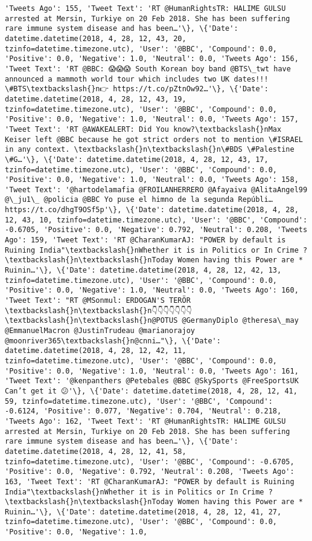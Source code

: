 \documentclass[11pt]{article}
\begin{document}
\begin{Verbatim}[commandchars=\\\{\}]
'Tweets Ago': 155, 'Tweet Text': 'RT @HumanRightsTR: HALIME GULSU arrested at Mersin, Turkiye on 20 Feb 2018. She has been suffering rare immune system disease and has been…'\}, \{'Date': datetime.datetime(2018, 4, 28, 12, 43, 20, tzinfo=datetime.timezone.utc), 'User': '@BBC', 'Compound': 0.0, 'Positive': 0.0, 'Negative': 1.0, 'Neutral': 0.0, 'Tweets Ago': 156, 'Tweet Text': 'RT @BBC: 😱😱😱 South Korean boy band @BTS\_twt have announced a mammoth world tour which includes two UK dates!!! \#BTS\textbackslash{}n👉 https://t.co/pZtnOw92…'\}, \{'Date': datetime.datetime(2018, 4, 28, 12, 43, 19, tzinfo=datetime.timezone.utc), 'User': '@BBC', 'Compound': 0.0, 'Positive': 0.0, 'Negative': 1.0, 'Neutral': 0.0, 'Tweets Ago': 157, 'Tweet Text': 'RT @AWAKEALERT: Did You know?\textbackslash{}nMax Keiser left @BBC because he got strict orders not to mention \#ISRAEL in any context. \textbackslash{}n\textbackslash{}n\#BDS \#Palestine \#G…'\}, \{'Date': datetime.datetime(2018, 4, 28, 12, 43, 17, tzinfo=datetime.timezone.utc), 'User': '@BBC', 'Compound': 0.0, 'Positive': 0.0, 'Negative': 1.0, 'Neutral': 0.0, 'Tweets Ago': 158, 'Tweet Text': '@hartodelamafia @FROILANHERRERO @Afayaiva @AlitaAngel99 @\_ju1\_ @policia @BBC Yo puse el himno de la segunda Repúbli… https://t.co/dhgT9OSf5p'\}, \{'Date': datetime.datetime(2018, 4, 28, 12, 43, 10, tzinfo=datetime.timezone.utc), 'User': '@BBC', 'Compound': -0.6705, 'Positive': 0.0, 'Negative': 0.792, 'Neutral': 0.208, 'Tweets Ago': 159, 'Tweet Text': 'RT @CharanKumarAJ: "POWER by default is Ruining India"\textbackslash{}nWhether it is in Politics or In Crime ? \textbackslash{}n\textbackslash{}nToday Women having this Power are * Ruinin…'\}, \{'Date': datetime.datetime(2018, 4, 28, 12, 42, 13, tzinfo=datetime.timezone.utc), 'User': '@BBC', 'Compound': 0.0, 'Positive': 0.0, 'Negative': 1.0, 'Neutral': 0.0, 'Tweets Ago': 160, 'Tweet Text': "RT @MSonmul: ERDOGAN'S TERÖR \textbackslash{}n\textbackslash{}n👇👇👇👇👇👇👇\textbackslash{}n\textbackslash{}n@POTUS @GermanyDiplo @theresa\_may @EmmanuelMacron @JustinTrudeau @marianorajoy @moonriver365\textbackslash{}n@cnni…"\}, \{'Date': datetime.datetime(2018, 4, 28, 12, 42, 11, tzinfo=datetime.timezone.utc), 'User': '@BBC', 'Compound': 0.0, 'Positive': 0.0, 'Negative': 1.0, 'Neutral': 0.0, 'Tweets Ago': 161, 'Tweet Text': '@kenpanthers @Petebales @BBC @SkySports @FreeSportsUK Can’t get it 😕'\}, \{'Date': datetime.datetime(2018, 4, 28, 12, 41, 59, tzinfo=datetime.timezone.utc), 'User': '@BBC', 'Compound': -0.6124, 'Positive': 0.077, 'Negative': 0.704, 'Neutral': 0.218, 'Tweets Ago': 162, 'Tweet Text': 'RT @HumanRightsTR: HALIME GULSU arrested at Mersin, Turkiye on 20 Feb 2018. She has been suffering rare immune system disease and has been…'\}, \{'Date': datetime.datetime(2018, 4, 28, 12, 41, 58, tzinfo=datetime.timezone.utc), 'User': '@BBC', 'Compound': -0.6705, 'Positive': 0.0, 'Negative': 0.792, 'Neutral': 0.208, 'Tweets Ago': 163, 'Tweet Text': 'RT @CharanKumarAJ: "POWER by default is Ruining India"\textbackslash{}nWhether it is in Politics or In Crime ? \textbackslash{}n\textbackslash{}nToday Women having this Power are * Ruinin…'\}, \{'Date': datetime.datetime(2018, 4, 28, 12, 41, 27, tzinfo=datetime.timezone.utc), 'User': '@BBC', 'Compound': 0.0, 'Positive': 0.0, 'Negative': 1.0, 
\end{Verbatim}
\end{document}
